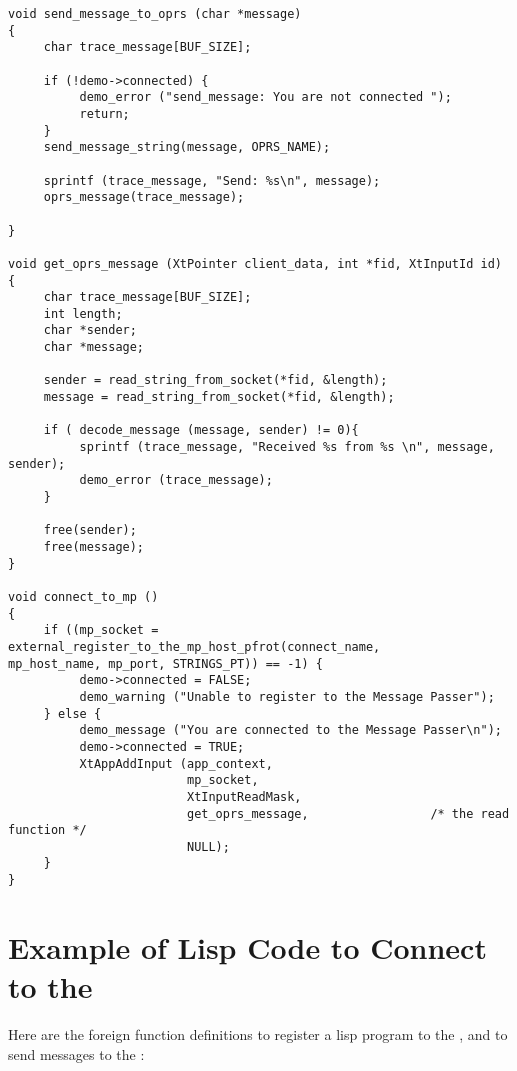 \begin{verbatim}
void send_message_to_oprs (char *message)
{
     char trace_message[BUF_SIZE];

     if (!demo->connected) {
          demo_error ("send_message: You are not connected ");
          return;
     }
     send_message_string(message, OPRS_NAME);

     sprintf (trace_message, "Send: %s\n", message);
     oprs_message(trace_message);

}

void get_oprs_message (XtPointer client_data, int *fid, XtInputId id)
{
     char trace_message[BUF_SIZE];
     int length;
     char *sender;
     char *message;

     sender = read_string_from_socket(*fid, &length);
     message = read_string_from_socket(*fid, &length);

     if ( decode_message (message, sender) != 0){
          sprintf (trace_message, "Received %s from %s \n", message, sender);
          demo_error (trace_message);
     }

     free(sender);
     free(message);
}

void connect_to_mp ()
{
     if ((mp_socket = external_register_to_the_mp_host_pfrot(connect_name,
mp_host_name, mp_port, STRINGS_PT)) == -1) {
          demo->connected = FALSE;
          demo_warning ("Unable to register to the Message Passer");
     } else {
          demo_message ("You are connected to the Message Passer\n");
          demo->connected = TRUE;
          XtAppAddInput (app_context,
                         mp_socket,
                         XtInputReadMask,
                         get_oprs_message,                 /* the read function */
                         NULL);
     }
}

\end{verbatim}

\section{Example of Lisp Code to Connect to the \MPA{}}

Here are the foreign function definitions to register a lisp program to
the \MPA{}, and to send messages to the \MPA{}:

